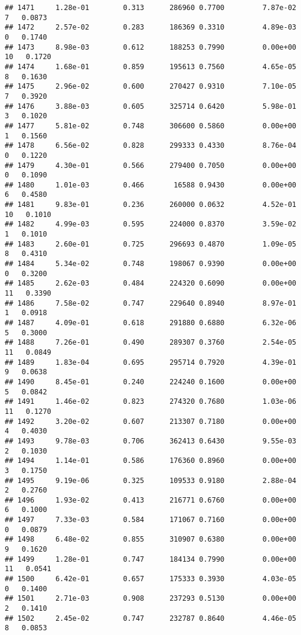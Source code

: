 \documentclass[
]{article}
\begin{document}
\begin{verbatim}
## 1471     1.28e-01        0.313      286960 0.7700         7.87e-02   7   0.0873
## 1472     2.57e-02        0.283      186369 0.3310         4.89e-03   0   0.1740
## 1473     8.98e-03        0.612      188253 0.7990         0.00e+00  10   0.1720
## 1474     1.68e-01        0.859      195613 0.7560         4.65e-05   8   0.1630
## 1475     2.96e-02        0.600      270427 0.9310         7.10e-05   7   0.3920
## 1476     3.88e-03        0.605      325714 0.6420         5.98e-01   3   0.1020
## 1477     5.81e-02        0.748      306600 0.5860         0.00e+00   1   0.1560
## 1478     6.56e-02        0.828      299333 0.4330         8.76e-04   0   0.1220
## 1479     4.30e-01        0.566      279400 0.7050         0.00e+00   0   0.1090
## 1480     1.01e-03        0.466       16588 0.9430         0.00e+00   6   0.4580
## 1481     9.83e-01        0.236      260000 0.0632         4.52e-01  10   0.1010
## 1482     4.99e-03        0.595      224000 0.8370         3.59e-02   1   0.1010
## 1483     2.60e-01        0.725      296693 0.4870         1.09e-05   8   0.4310
## 1484     5.34e-02        0.748      198067 0.9390         0.00e+00   0   0.3200
## 1485     2.62e-03        0.484      224320 0.6090         0.00e+00  11   0.3390
## 1486     7.58e-02        0.747      229640 0.8940         8.97e-01   1   0.0918
## 1487     4.09e-01        0.618      291880 0.6880         6.32e-06   5   0.3000
## 1488     7.26e-01        0.490      289307 0.3760         2.54e-05  11   0.0849
## 1489     1.83e-04        0.695      295714 0.7920         4.39e-01   9   0.0638
## 1490     8.45e-01        0.240      224240 0.1600         0.00e+00   5   0.0842
## 1491     1.46e-02        0.823      274320 0.7680         1.03e-06  11   0.1270
## 1492     3.20e-02        0.607      213307 0.7180         0.00e+00   4   0.4030
## 1493     9.78e-03        0.706      362413 0.6430         9.55e-03   2   0.1030
## 1494     1.14e-01        0.586      176360 0.8960         0.00e+00   3   0.1750
## 1495     9.19e-06        0.325      109533 0.9180         2.88e-04   2   0.2760
## 1496     1.93e-02        0.413      216771 0.6760         0.00e+00   6   0.1000
## 1497     7.33e-03        0.584      171067 0.7160         0.00e+00   0   0.0879
## 1498     6.48e-02        0.855      310907 0.6380         0.00e+00   9   0.1620
## 1499     1.28e-01        0.747      184134 0.7990         0.00e+00  11   0.0541
## 1500     6.42e-01        0.657      175333 0.3930         4.03e-05   0   0.1400
## 1501     2.71e-03        0.908      237293 0.5130         0.00e+00   2   0.1410
## 1502     2.45e-02        0.747      232787 0.8640         4.46e-05   8   0.0853

\end{verbatim}
\end{document}
